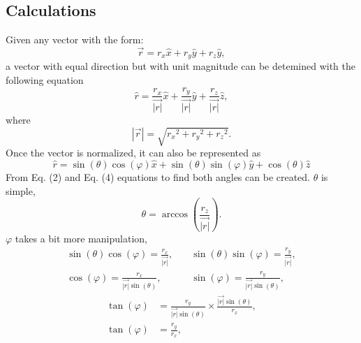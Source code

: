 \documentclass{exam}
\begin{document}
    \subsection{Calculations}
        Given any vector with the form:
        \begin{equation}
            \vec{r} = r_x\hat{x} + r_y\hat{y} + r_z\hat{y},
        \end{equation}
        a vector with equal direction but with unit magnitude can be detemined with the following equation
        \begin{equation}
            \hat{r} = \frac{r_x}{{\vec{\left|r\right|}}}\hat{x} + \frac{r_y}{\vec{{\left|r\right|}}}\hat{y} + \frac{r_z}{{\vec{\left|r\right|}}}\hat{z},
        \end{equation} 
        where
        \begin{equation}
            {{\left|\vec{r}\right|}} = \sqrt{{r_x}^2 + {r_y}^2 + {r_z}^2}.
        \end{equation}
        Once the vector is normalized, it can also be represented as
        \begin{equation}
            \hat{r} = \sin(\theta)\cos(\varphi)\hat{x} + \sin(\theta)\sin(\varphi)\hat{y} + \cos(\theta)\hat{z}
        \end{equation}
        From Eq. (2) and Eq. (4) equations to find both angles can be created. $\theta$ is simple,
        \begin{equation}
            \theta = \arccos\left(\frac{r_z}{{\vec{\left|r\right|}}}\right).
        \end{equation} 
        $\varphi$ takes a bit more manipulation,
        \begin{align*}
            \sin\left(\theta\right)\cos\left(\varphi\right) =  \frac{r_x}{{\vec{\left|r\right|}}}, &\quad \sin\left(\theta\right)\sin\left(\varphi\right) =  \frac{r_y}{{\vec{\left|r\right|}}},\\
            \cos\left(\varphi\right) =  \frac{r_x}{{\vec{\left|r\right|}}\sin\left(\theta\right)}, &\quad \sin\left(\varphi\right) =  \frac{r_y}{{\vec{\left|r\right|}}\sin\left(\theta\right)},
        \end{align*}
        \begin{align*}
            \tan\left(\varphi\right) &= \frac{r_y}{{\vec{\left|r\right|}}\sin\left(\theta\right)}\times\frac{{\vec{\left|r\right|}}\sin\left(\theta\right)}{r_x},\\     
            \tan\left(\varphi\right) &= \frac{r_y}{r_x},
        \end{align*}
\end{document}
